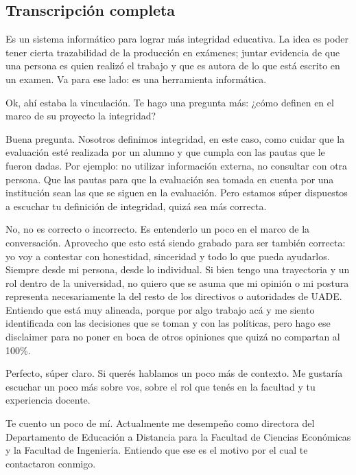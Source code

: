 \subsection*{Transcripción completa}
\begin{description}[leftmargin=0cm, labelsep=0.5cm, style=nextline]
\item[\textbf{Entrevistadores:}] Es un sistema informático para lograr más integridad educativa. La idea es poder tener cierta trazabilidad de la producción en exámenes; juntar evidencia de que una persona es quien realizó el trabajo y que es autora de lo que está escrito en un examen. Va para ese lado: es una herramienta informática.
\item[\textbf{Entrevistada:}] Ok, ahí estaba la vinculación. Te hago una pregunta más: ¿cómo definen en el marco de su proyecto la integridad?
\item[\textbf{Entrevistadores:}] Buena pregunta. Nosotros definimos integridad, en este caso, como cuidar que la evaluación esté realizada por un alumno y que cumpla con las pautas que le fueron dadas. Por ejemplo: no utilizar información externa, no consultar con otra persona. Que las pautas para que la evaluación sea tomada en cuenta por una institución sean las que se siguen en la evaluación. Pero estamos súper dispuestos a escuchar tu definición de integridad, quizá sea más correcta.
\item[\textbf{Entrevistada:}] No, no es correcto o incorrecto. Es entenderlo un poco en el marco de la conversación. Aprovecho que esto está siendo grabado para ser también correcta: yo voy a contestar con honestidad, sinceridad y todo lo que pueda ayudarlos. Siempre desde mi persona, desde lo individual. Si bien tengo una trayectoria y un rol dentro de la universidad, no quiero que se asuma que mi opinión o mi postura representa necesariamente la del resto de los directivos o autoridades de UADE.
Entiendo que está muy alineada, porque por algo trabajo acá y me siento identificada con las decisiones que se toman y con las políticas, pero hago ese disclaimer para no poner en boca de otros opiniones que quizá no compartan al 100\%.
\item[\textbf{Entrevistadores:}] Perfecto, súper claro. Si querés hablamos un poco más de contexto. Me gustaría escuchar un poco más sobre vos, sobre el rol que tenés en la facultad y tu experiencia docente.
\item[\textbf{Entrevistada:}] Te cuento un poco de mí. Actualmente me desempeño como directora del Departamento de Educación a Distancia para la Facultad de Ciencias Económicas y la Facultad de Ingeniería. Entiendo que ese es el motivo por el cual te contactaron conmigo.

\end{description}
